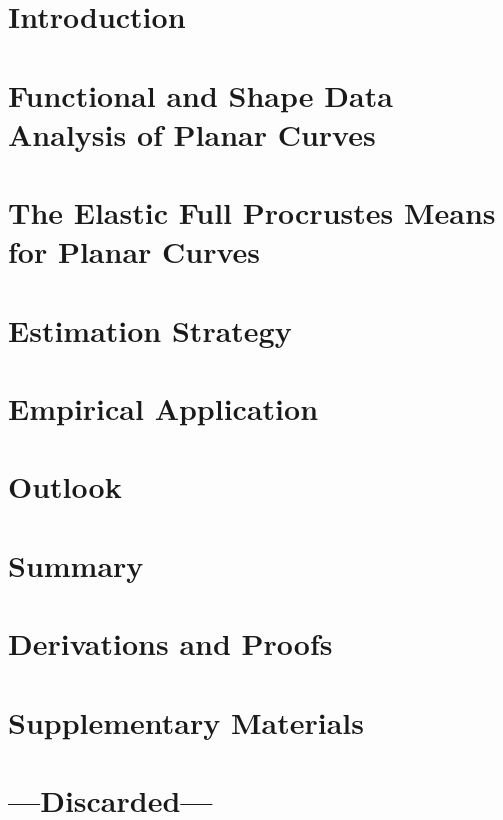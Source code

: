 \documentclass[a4paper,12pt,english,headings=small]{scrreprt}
\begin{document}
\tableofcontents



\newpage
{}
\chapter{Introduction}
\label{sec:intro}


\newpage
\chapter{Functional and Shape Data Analysis of Planar Curves}
\label{sec:theo}


\newpage
\chapter{The Elastic Full Procrustes Means for Planar Curves}
\label{sec:mean}


\newpage
\chapter{Estimation Strategy}
\label{sec:algo}

\newpage
\chapter{Empirical Application}
\label{sec:app}

\newpage
\chapter{Outlook}
\label{sec:outl}

\newpage
\chapter{Summary}
\label{sec:sum}

\newpage
\nocite{*}
\printbibliography[heading=bibintoc] %



\newpage
\appendix
{}
\chapter{Derivations and Proofs}
\label{app:deriv}


\newpage
\chapter{Supplementary Materials}
\label{app:deriv}


\newpage
\chapter{---Discarded---}

\end{document}
